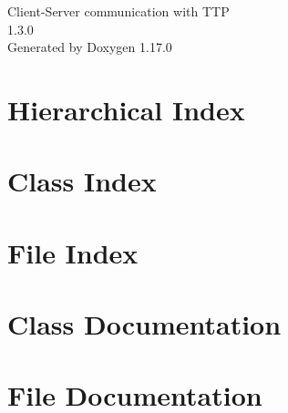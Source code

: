 \documentclass[twoside]{book}
\newcommand{\+}{\discretionary{\mbox{\scriptsize$\hookleftarrow$}}{}{}}
\newcommand{\clearemptydoublepage}{%
    \newpage{\pagestyle{empty}\cleardoublepage}%
  }
\begin{document}
  \raggedbottom
    \hypersetup{pageanchor=false,
                bookmarksnumbered=true,
                pdfencoding=unicode
               }
  \begin{titlepage}
  \vspace*{7cm}
  \begin{center}%
  {\Large Client-\/\+Server communication with TTP}\\
  [1ex]\large 1.\+3.\+0 \\
  \vspace*{1cm}
  {\large Generated by Doxygen 1.17.0}\\
  \end{center}
  \end{titlepage}
  \clearemptydoublepage
  \tableofcontents
  \clearemptydoublepage
  \hypersetup{pageanchor=true}
\chapter{Hierarchical Index}

\chapter{Class Index}

\chapter{File Index}

\chapter{Class Documentation}




\chapter{File Documentation}



  \backmatter
  \newpage
  \clearemptydoublepage
  \printindex
\end{document}

